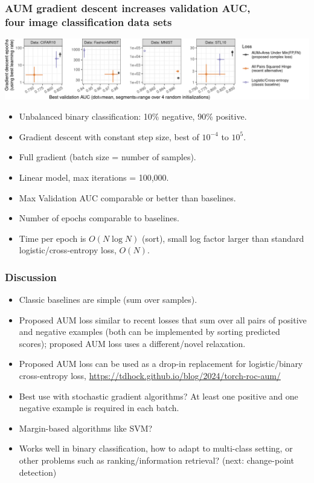 \documentclass[t]{beamer}
\begin{document}
\begin{frame}
  \frametitle{AUM gradient descent increases validation AUC,\\
    four image classification data sets}
 
\includegraphics[width=\textwidth]{data_Classif_batchtools_best_valid_scatter}

\begin{itemize}
\item Unbalanced binary classification: 10\% negative, 90\% positive.
\item Gradient descent with constant step size, best of $10^{-4}$ to $10^5$.
\item Full gradient (batch size = number of samples).
\item Linear model, max iterations = 100,000.
\item Max Validation AUC comparable or better than baselines.
\item Number of epochs comparable to baselines.
\item Time per epoch is $O(N \log N)$ (sort), small log factor larger than standard logistic/cross-entropy loss, $O(N)$.
\end{itemize}

\end{frame}

\begin{frame}
  \frametitle{Discussion}
  \begin{itemize}
  \item Classic baselines are simple (sum over samples).
  \item Proposed AUM loss similar to recent losses that sum over all
    pairs of positive and negative examples (both can be implemented
    by sorting predicted scores); proposed AUM loss uses a
    different/novel relaxation.
  \item Proposed AUM loss can be used as a drop-in replacement for logistic/binary cross-entropy loss, \url{https://tdhock.github.io/blog/2024/torch-roc-aum/}
  \item Best use with stochastic gradient algorithms?
    At least one positive and one negative example is required in each
    batch.
  \item Margin-based algorithms like SVM?
  \item Works well in binary classification, how to adapt to
    multi-class setting, or other problems such as ranking/information
    retrieval? (next: change-point detection)
  \end{itemize}
\end{frame}
\end{document}
